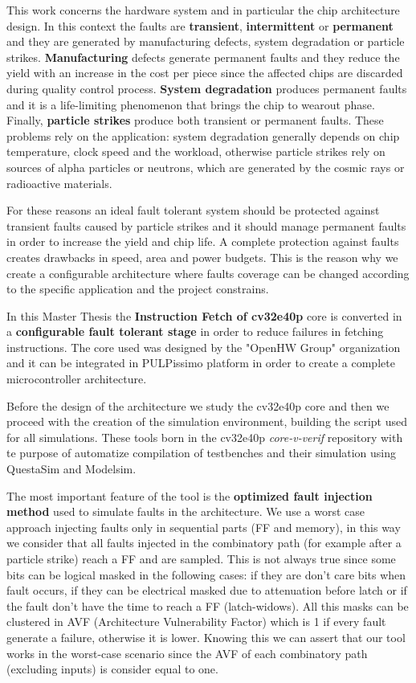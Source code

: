 \documentclass[corpo=11pt,english,numerazioneromana]{toptesi}
\begin{document}
This work concerns the hardware system and in particular the chip architecture design. In this context the faults are \textbf{transient}, \textbf{intermittent} or \textbf{permanent} and they are generated by manufacturing defects, system degradation or particle strikes.\textbf{ Manufacturing} defects generate permanent faults and they reduce the yield with an increase in the cost per piece since the affected chips are discarded during quality control process. \textbf{System degradation} produces permanent faults and it is a life-limiting phenomenon that brings the chip to wearout phase. Finally, \textbf{particle strikes} produce both transient or permanent faults. 
These problems rely on the application: system degradation generally depends on chip temperature, clock speed and the workload, otherwise particle strikes rely on sources of alpha particles or neutrons, which are generated by the cosmic rays or radioactive materials.

For these reasons an ideal fault tolerant system should be protected against transient faults caused by particle strikes and it should manage permanent faults in order to increase the yield and chip life. A complete protection against faults creates drawbacks in speed, area and power budgets. This is the reason why we create a configurable architecture where faults coverage can be changed according to the specific application and the project constrains.   

In this Master Thesis the \textbf{Instruction Fetch of cv32e40p} core is converted in a \textbf{configurable fault tolerant stage} in order to reduce failures in fetching instructions. The core used was designed by the "OpenHW Group" organization and it can be integrated in PULPissimo platform in order to create a complete microcontroller architecture. 

Before the design of the architecture we study the cv32e40p core and then we proceed with the creation of the simulation environment, building the script used for all simulations. These tools born in the cv32e40p \textit{core-v-verif} repository with te purpose of automatize compilation of testbenches and their simulation using QuestaSim and Modelsim. 

 The most important feature of the tool is the \textbf{optimized fault injection method} used to simulate faults in the architecture. We use a worst case approach injecting faults only in sequential parts (FF and memory), in this way we consider that all faults injected in the combinatory path (for example after a particle strike) reach a FF and are sampled. This is not always true since some bits can be logical masked in the following cases: if they are don't care bits when fault occurs, if they can be electrical masked due to attenuation before latch or if the fault don't have the time to reach a FF (latch-widows). All this masks can be clustered in AVF (Architecture Vulnerability Factor) which is 1 if every fault generate a failure, otherwise it is lower. Knowing this we can assert that our tool works in the worst-case scenario since the AVF of each combinatory path (excluding inputs) is consider equal to one.
\end{document}
